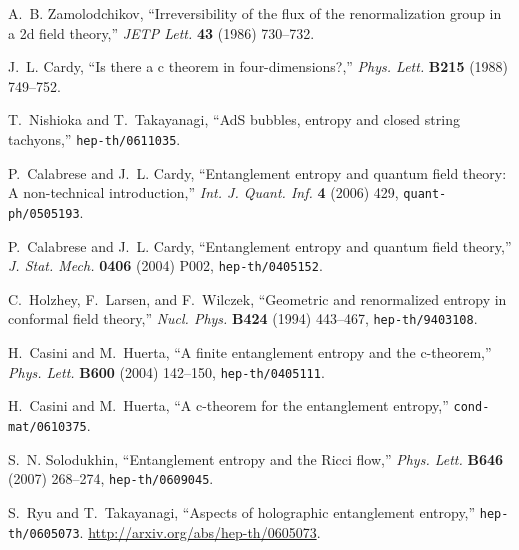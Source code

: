 \documentclass[12pt]{article}
\begin{document}
\providecommand{\href}[2]{#2}\begingroup\raggedright\begin{thebibliography}{10}

A.~B. Zamolodchikov, ``Irreversibility of the flux of the renormalization group
  in a 2d field theory,''
{\em JETP Lett.} {\bf 43} (1986)  730--732.

J.~L. Cardy, ``Is there a c theorem in four-dimensions?,''
{\em Phys. Lett.} {\bf B215} (1988)  749--752.

T.~Nishioka and T.~Takayanagi, ``AdS bubbles, entropy and closed string
  tachyons,'' \href{http://arxiv.org/abs/hep-th/0611035}{{\tt hep-th/0611035}}.

P.~Calabrese and J.~L. Cardy, ``Entanglement entropy and quantum field theory:
  A non-technical introduction,'' {\em Int. J. Quant. Inf.} {\bf 4} (2006)
  429,
\href{http://arxiv.org/abs/quant-ph/0505193}{{\tt quant-ph/0505193}}.

P.~Calabrese and J.~L. Cardy, ``Entanglement entropy and quantum field
  theory,'' {\em J. Stat. Mech.} {\bf 0406} (2004)  P002,
\href{http://arxiv.org/abs/hep-th/0405152}{{\tt hep-th/0405152}}.

C.~Holzhey, F.~Larsen, and F.~Wilczek, ``Geometric and renormalized entropy in
  conformal field theory,'' {\em Nucl. Phys.} {\bf B424} (1994)  443--467,
\href{http://arxiv.org/abs/hep-th/9403108}{{\tt hep-th/9403108}}.

H.~Casini and M.~Huerta, ``A finite entanglement entropy and the c-theorem,''
  {\em Phys. Lett.} {\bf B600} (2004)  142--150,
  \href{http://arxiv.org/abs/hep-th/0405111}{{\tt hep-th/0405111}}.

H.~Casini and M.~Huerta, ``A c-theorem for the entanglement entropy,''
  \href{http://arxiv.org/abs/cond-mat/0610375}{{\tt cond-mat/0610375}}.

S.~N. Solodukhin, ``Entanglement entropy and the Ricci flow,'' {\em Phys.
  Lett.} {\bf B646} (2007)  268--274,
\href{http://arxiv.org/abs/hep-th/0609045}{{\tt hep-th/0609045}}.

S.~Ryu and T.~Takayanagi, ``Aspects of holographic entanglement entropy,''
  \href{http://arxiv.org/abs/hep-th/0605073}{{\tt hep-th/0605073}}.
\url{http://arxiv.org/abs/hep-th/0605073}.


\end{thebibliography}
\end{document}
